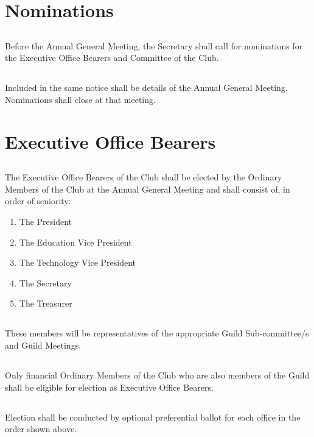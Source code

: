 \documentclass[10.5pt]{article}
\begin{document}
\section{Nominations}
\subsection{} Before the Annual General Meeting, the Secretary shall call for nominations for the Executive
Office Bearers and Committee of the Club.
\subsection{} Included in the same notice shall be details of the Annual General Meeting. Nominations shall close at that meeting.
\newline


\section{Executive Office Bearers}
\subsection{} The Executive Office Bearers of the Club shall be elected by the Ordinary Members of the Club at the Annual General Meeting and shall consist of, in order of seniority:
\begin{enumerate} [label=(\alph*)]
    \item The President
    \item The Education Vice President
    \item The Technology Vice President
    \item The Secretary
    \item The Treasurer
\end{enumerate}

\subsection{} These members will be representatives of the appropriate Guild Sub-committee/s and Guild Meetings. 
\subsection{} Only financial Ordinary Members of the Club who are also members of the Guild shall be eligible for election as Executive Office Bearers. 
\subsection{} Election shall be conducted by optional preferential ballot for each office in the order shown above. 
\end{document}
